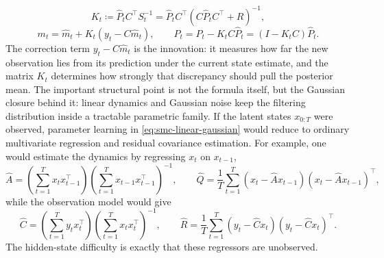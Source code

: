 \begin{equation}
  K_t \coloneqq \hat P_t C^\top S_t^{-1}
  =
  \hat P_t C^\top (C\hat P_t C^\top + R)^{-1},
  \label{eq:smc-kalman-gain}
\end{equation}
\begin{equation}
  m_t = \hat m_t + K_t(y_t - C\hat m_t),
  \qquad
  P_t = \hat P_t - K_t C\hat P_t = (I-K_tC)\hat P_t.
  \label{eq:smc-kalman-update}
\end{equation}
The correction term $y_t - C\hat m_t$ is the innovation: it measures how far the new observation lies from its prediction under the current state estimate, and the matrix $K_t$ determines how strongly that discrepancy should pull the posterior mean.
The important structural point is not the formula itself, but the Gaussian closure behind it:
linear dynamics and Gaussian noise keep the filtering distribution inside a tractable parametric family.
If the latent states $x_{0:T}$ were observed, parameter learning in \eqref{eq:smc-linear-gaussian} would reduce to ordinary multivariate regression and residual covariance estimation.
For example, one would estimate the dynamics by regressing $x_t$ on $x_{t-1}$,
\[
  \hat A
  =
  \left(\sum_{t=1}^T x_t x_{t-1}^\top\right)
  \left(\sum_{t=1}^T x_{t-1}x_{t-1}^\top\right)^{-1},
  \qquad
  \hat Q
  =
  \frac{1}{T}\sum_{t=1}^T
  (x_t-\hat A x_{t-1})(x_t-\hat A x_{t-1})^\top,
\]
while the observation model would give
\[
  \hat C
  =
  \left(\sum_{t=1}^T y_t x_t^\top\right)
  \left(\sum_{t=1}^T x_t x_t^\top\right)^{-1},
  \qquad
  \hat R
  =
  \frac{1}{T}\sum_{t=1}^T
  (y_t-\hat C x_t)(y_t-\hat C x_t)^\top.
\]
The hidden-state difficulty is exactly that these regressors are unobserved.

